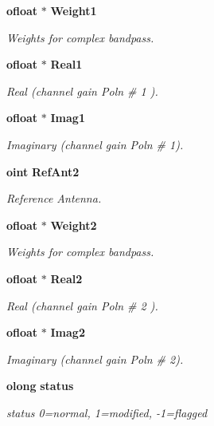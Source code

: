 \begin{CompactItemize}
{\bf ofloat} $\ast$ {\bf Weight1}
\begin{CompactList}\small\item\em Weights for complex bandpass. \item\end{CompactList}\item 
{\bf ofloat} $\ast$ {\bf Real1}
\begin{CompactList}\small\item\em Real (channel gain Poln \# 1 ). \item\end{CompactList}\item 
{\bf ofloat} $\ast$ {\bf Imag1}
\begin{CompactList}\small\item\em Imaginary (channel gain Poln \# 1). \item\end{CompactList}\item 
{\bf oint} {\bf Ref\-Ant2}
\begin{CompactList}\small\item\em Reference Antenna. \item\end{CompactList}\item 
{\bf ofloat} $\ast$ {\bf Weight2}
\begin{CompactList}\small\item\em Weights for complex bandpass. \item\end{CompactList}\item 
{\bf ofloat} $\ast$ {\bf Real2}
\begin{CompactList}\small\item\em Real (channel gain Poln \# 2 ). \item\end{CompactList}\item 
{\bf ofloat} $\ast$ {\bf Imag2}
\begin{CompactList}\small\item\em Imaginary (channel gain Poln \# 2). \item\end{CompactList}\item 
{\bf olong} {\bf status}
\begin{CompactList}\small\item\em status 0=normal, 1=modified, -1=flagged \item\end{CompactList}\end{CompactItemize}


